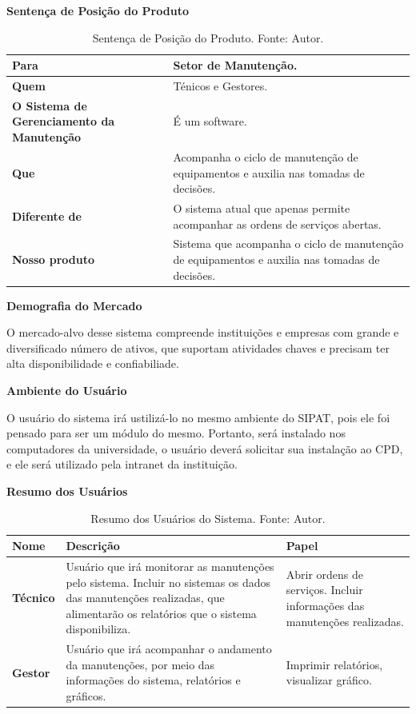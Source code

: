 \pagebreak

\textbf{Sentença de Posição do Produto}

\begin{table}[H]
\centering
\caption{Sentença de Posição do Produto. Fonte: Autor.}
\label{tab-produto}
\begin{tabular}{ | p{5cm} | p{10cm} | }
\hline
	\textbf{Para} & Setor de Manutenção. \\ \hline
	\textbf{Quem} & Ténicos e Gestores. \\ \hline
	\textbf{O Sistema de Gerenciamento da Manutenção} & É um software. \\ \hline
	\textbf{Que} & Acompanha o ciclo de manutenção de equipamentos e auxilia nas tomadas de decisões. \\ \hline
	\textbf{Diferente de} & O sistema atual que apenas permite acompanhar as ordens de serviços abertas. \\ \hline
	\textbf{Nosso produto} & Sistema que acompanha o ciclo de manutenção de equipamentos e auxilia nas tomadas de decisões. \\ \hline
\end{tabular}
\end{table}

\textbf{Demografia do Mercado}

O mercado-alvo desse sistema compreende instituições e empresas com grande e diversificado número de ativos, que suportam atividades chaves e precisam ter alta disponibilidade e confiabiliade.

\textbf{Ambiente do Usuário}

O usuário do sistema irá ustilizá-lo no mesmo ambiente do SIPAT, pois ele foi pensado para ser um módulo do mesmo. Portanto, será instalado nos computadores da universidade, o usuário deverá solicitar sua instalação ao CPD, e ele será utilizado pela intranet da instituição.

\textbf{Resumo dos Usuários}

\begin{table}[H]
\centering
\caption{Resumo dos Usuários do Sistema. Fonte: Autor.}
\label{tab-resumo-usuarios}
\begin{tabular}{ | p{2cm} | p{7cm} | p{5cm} | }
\hline
	\textbf{Nome} & \textbf{Descrição} & \textbf{Papel} \\ \hline
	\textbf{Técnico} & Usuário que irá monitorar as manutenções pelo sistema. Incluir no sistemas os dados das manutenções realizadas, que alimentarão os relatórios que o sistema disponibiliza. & Abrir ordens de serviços. Incluir informações das manutenções realizadas. \\ \hline
	\textbf{Gestor} & Usuário que irá acompanhar o andamento da manutenções, por meio das informações do sistema, relatórios e gráficos. & Imprimir relatórios, visualizar gráfico. \\ \hline
\end{tabular}
\end{table}

